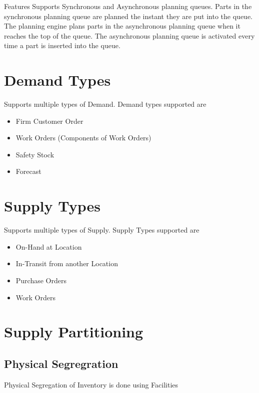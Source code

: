 \documentclass[letterpaper,10pt,english]{sphinxmanual}
\begin{document}
Features Supports Synchronous and Asynchronous planning queues. Parts in
the synchronous planning queue are planned the instant they are put into
the queue. The planning engine plans parts in the asynchronous planning
queue when it reaches the top of the queue. The asynchronous planning
queue is activated every time a part is inserted into the queue.


\section{Demand Types}
\label{\detokenize{index:demand-types}}
Supports multiple types of Demand. Demand types supported are
\begin{itemize}
\item {} 
Firm Customer Order

\item {} 
Work Orders (Components of Work Orders)

\item {} 
Safety Stock

\item {} 
Forecast

\end{itemize}


\section{Supply Types}
\label{\detokenize{index:supply-types}}
Supports multiple types of Supply. Supply Types supported are
\begin{itemize}
\item {} 
On-Hand at Location

\item {} 
In-Transit from another Location

\item {} 
Purchase Orders

\item {} 
Work Orders

\end{itemize}


\section{Supply Partitioning}
\label{\detokenize{index:supply-partitioning}}

\subsection{Physical Segregration}
\label{\detokenize{index:physical-segregration}}
Physical Segregation of Inventory is done using Facilities
\end{document}
